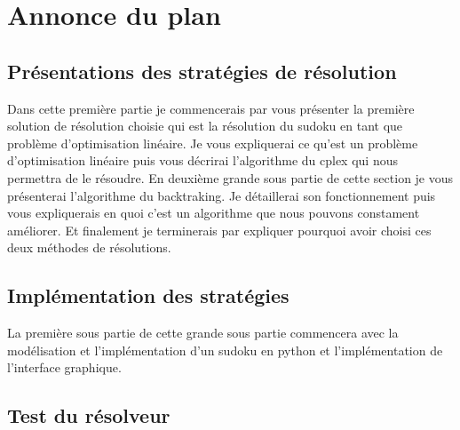 \hypertarget{Annonce du plan}{%
\section{Annonce du plan}\label{annonce du plan}}

\subsection{Présentations des stratégies de résolution}

Dans cette première partie je commencerais par vous présenter la première solution de résolution choisie qui est la résolution du sudoku en tant que problème d'optimisation linéaire.
Je vous expliquerai ce qu'est un problème d'optimisation linéaire puis vous décrirai l'algorithme du cplex qui nous permettra de le résoudre.
En deuxième grande sous partie de cette section je vous présenterai l'algorithme du backtraking.
Je détaillerai son fonctionnement puis vous expliquerais en quoi c'est un algorithme que nous pouvons constament améliorer.
Et finalement je terminerais par expliquer pourquoi avoir choisi ces deux méthodes de résolutions.
\subsection{Implémentation des stratégies}
La première sous partie de cette grande sous partie commencera avec la modélisation et l'implémentation d'un sudoku en python et l'implémentation de l'interface graphique.

\subsection{Test du résolveur}
